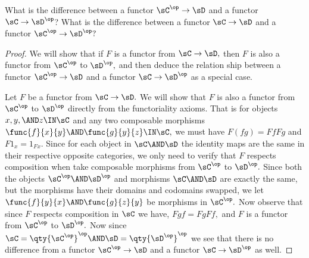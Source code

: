 \documentclass[main.tex]{subfiles}
\begin{document}
\begin{exercise}
	What is the difference between a functor
	$ \sC^{\op}\to \sD $ and a functor $ \sC\to \sD^{\op} $? What is the
	difference between a functor  $ \sC \to \sD $ and a functor $ \sC^{\op}\to \sD^{\op}?$
\end{exercise}

\begin{proof}
	We will show that if $ F $ is a functor from $ \sC\to\sD,$ then $ F $ is
	also a functor from $ \sC^\op $ to $ \sD^\op,$ and then deduce the relation
	ship between a functor $ \sC^{\op}\to \sD $ and a functor $ \sC\to
	\sD^{\op}$ as a special case.

	Let $ F $ be a functor from $ \sC\to\sD.$ We will show that $ F $ 
	is also a functor from $ \sC^\op $ to $ \sD^\op$ directly from the 
	functoriality axioms.
	That is for objects $ x,y,\AND z\IN\sC $ and any two composable
	morphisms $ \func{f}{x}{y}\AND \func{g}{y}{z} \IN\sC,$  we must have
	$F(fg)=FfFg$ and $ F1_x=1_{Fx}.$ Since for each object in $ \sC\AND \sD $
	the identity maps are the same in their respective opposite categories, we
	only need to verify that $ F $ respects composition when take composable
	morphisms from $\sC^\op $ to $ \sD^\op.$ Since both the objects $ \sC^\op
	\AND\sD^\op$ and morphisms $ \sC\AND \sD$ are exactly the same, but the morphisms have their domains and codomains swapped, we let $ \func{f}{y}{x} \AND \func{g}{z}{y}$ be morphisms in $ \sC^\op. $ Now observe that since $ F $ respects composition in $ \sC $ we have,
	$ Fgf=FgFf, $ and $ F $ is a functor from $ \sC^\op  $ to $
	\sD^\op. $ Now since $ \sC=\qty{\sC^\op}^\op \AND \sD=\qty{\sD^\op}^\op$ we
	see that there is no difference from a functor $ \sC^{\op} \to \sD $ and a
	functor $ \sC\to \sD^{\op}  $ as well.
\end{proof}
\end{document}
